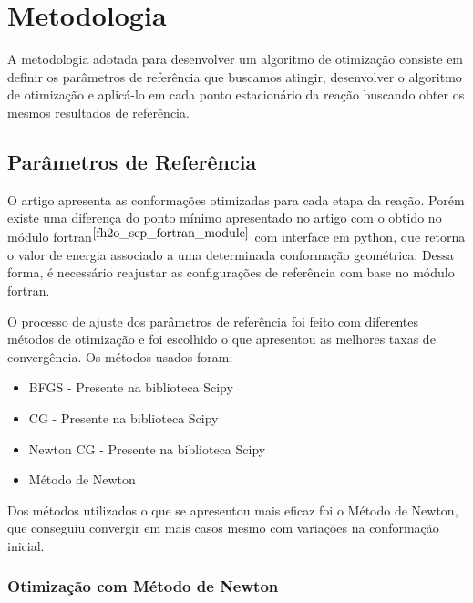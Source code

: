 \section{Metodologia}

A metodologia adotada para desenvolver um algoritmo de otimização consiste em definir os parâmetros de referência que buscamos atingir, desenvolver o algoritmo de otimização e aplicá-lo em cada ponto estacionário da reação buscando obter os mesmos resultados de referência.

\subsection{Parâmetros de Referência}

O artigo \cite{fh2o_first_sep} apresenta as conformações otimizadas para cada etapa da reação. Porém existe uma diferença do ponto mínimo apresentado no artigo com o obtido no módulo fortran$^{ \cite{fh2o_sep_fortran_module} }$ com interface em python, que retorna o valor de energia associado a uma determinada conformação geométrica. Dessa forma, é necessário reajustar as configurações de referência com base no módulo fortran.

O processo de ajuste dos parâmetros de referência foi feito com diferentes métodos de otimização e foi escolhido o que apresentou as melhores taxas de convergência. Os métodos usados foram:
%
\begin{itemize}[itemsep=0pt,parsep=0pt]
  \item BFGS - Presente na biblioteca Scipy
  \item CG - Presente na biblioteca Scipy
  \item Newton CG - Presente na biblioteca Scipy
  \item Método de Newton
\end{itemize}
%
Dos métodos utilizados o que se apresentou mais eficaz foi o Método de Newton, que conseguiu convergir em mais casos mesmo com variações na conformação inicial.

\subsubsection{Otimização com Método de Newton}

